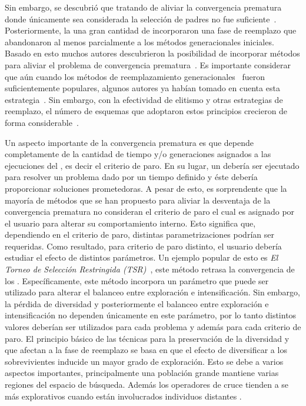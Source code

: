 %
Sin embargo, se descubrió que tratando de aliviar la convergencia prematura donde únicamente sea considerada la selección de padres no fue suficiente~\cite{blickle1996comparison}.
%
Posteriormente, la una gran cantidad de \EAS{} incorporaron una fase de reemplazo que abandonaron al menos parcialmente a los métodos generacionales iniciales.
%
Basado en esto muchos autores descubrieron la posibilidad de incorporar métodos para aliviar el problema de convergencia prematura~\cite{Crepinsek:13}.
%
Es importante considerar que aún cuando los métodos de reemplazamiento generacionales~\cite{de2006evolutionary} fueron suficientemente populares, algunos autores ya habían tomado en cuenta esta estrategia~\cite{mahfoud1992crowding}.
%
Sin embargo, con la efectividad de elitismo y otras estrategias de reemplazo, el número de esquemas que adoptaron estos principios crecieron de forma considerable~\cite{lozano2008replacement}.
%

Un aspecto importante de la convergencia prematura es que depende completamente de la cantidad de tiempo y/o generaciones asignados a las ejecuciones del \EA{}, es decir el criterio de paro.
%
En su lugar, un \EA{} debería ser ejecutado para resolver un problema dado por un tiempo definido y éste debería proporcionar soluciones prometedoras.
%
A pesar de esto, es sorprendente que la mayoría de métodos que se han propuesto para aliviar la desventaja de la convergencia prematura no consideran el criterio de paro el cual es asignado por el usuario para alterar su comportamiento interno.
%
Esto significa que, dependiendo en el criterio de paro, distintas parametrizaciones podrían ser requeridas.
%
Como resultado, para criterio de paro distinto, el usuario debería estudiar el efecto de distintos parámetros.
%
Un ejemplo popular de esto es \textit{El Torneo de Selección Restringida (TSR)}~\cite{Crepinsek:13}, este método retrasa la convergencia de los \EAS{}.
%
Específicamente, este método incorpora un parámetro que puede ser utilizado para alterar el balanceo entre exploración e intensificación.
%
Sin embargo, la pérdida de diversidad y posteriormente el balanceo entre exploración e intensificación no dependen únicamente en este parámetro, por lo tanto distintos valores deberían ser utilizados para cada problema y además para cada criterio de paro.
%
El principio básico de las técnicas para la preservación de la diversidad y que afectan a la fase de reemplazo se basa en que el efecto de diversificar a los sobrevivientes inducide un mayor grado de exploración.
%
Esto se debe a varios aspectos importantes, principalmente una población grande mantiene varias regiones del espacio de búsqueda.
%
Además los operadores de cruce tienden a se más explorativos cuando están involucrados individuos distantes \cite{eiben1998evolutionary}.


